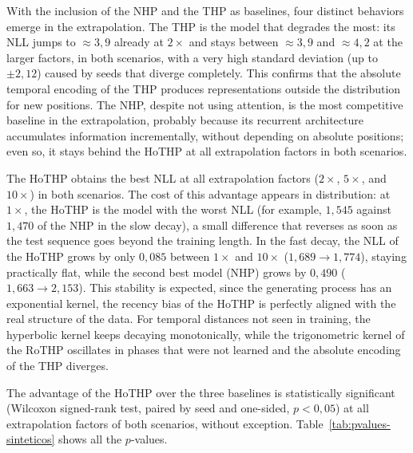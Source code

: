 With the inclusion of the NHP and the THP as baselines, four distinct behaviors emerge in the extrapolation. The THP is the model that degrades the most: its NLL jumps to $\approx 3{,}9$ already at $2\times$ and stays between $\approx 3{,}9$ and $\approx 4{,}2$ at the larger factors, in both scenarios, with a very high standard deviation (up to $\pm 2{,}12$) caused by seeds that diverge completely. This confirms that the absolute temporal encoding of the THP produces representations outside the distribution for new positions. The NHP, despite not using attention, is the most competitive baseline in the extrapolation, probably because its recurrent architecture accumulates information incrementally, without depending on absolute positions; even so, it stays behind the HoTHP at all extrapolation factors in both scenarios.

The HoTHP obtains the best NLL at all extrapolation factors ($2\times$, $5\times$, and $10\times$) in both scenarios. The cost of this advantage appears in distribution: at $1\times$, the HoTHP is the model with the worst NLL (for example, $1{,}545$ against $1{,}470$ of the NHP in the slow decay), a small difference that reverses as soon as the test sequence goes beyond the training length. In the fast decay, the NLL of the HoTHP grows by only $0{,}085$ between $1\times$ and $10\times$ ($1{,}689 \to 1{,}774$), staying practically flat, while the second best model (NHP) grows by $0{,}490$ ($1{,}663 \to 2{,}153$). This stability is expected, since the generating process has an exponential kernel, the recency bias of the HoTHP is perfectly aligned with the real structure of the data. For temporal distances not seen in training, the hyperbolic kernel keeps decaying monotonically, while the trigonometric kernel of the RoTHP oscillates in phases that were not learned and the absolute encoding of the THP diverges.

The advantage of the HoTHP over the three baselines is statistically significant (Wilcoxon signed-rank test, paired by seed and one-sided, $p < 0{,}05$) at all extrapolation factors of both scenarios, without exception. Table~\ref{tab:pvalues-sinteticos} shows all the $p$-values.

